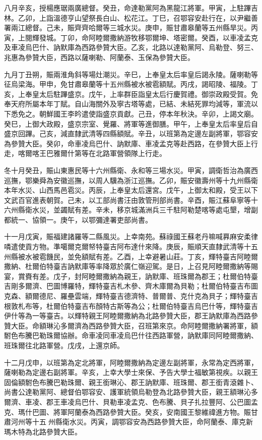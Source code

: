 \begin{pinyinscope}
八月辛亥，授楊應琚兩廣總督。癸丑，命達勒黨阿為黑龍江將軍。甲寅，上駐蹕吉林。乙卯，上詣溫德亨山望祭長白山、松花江。丁巳，召鄂容安赴行在，以尹繼善署兩江總督。己未，賑齊齊哈爾等三城水災。庚申，賑甘肅皋蘭等五州縣旱災。丙寅，上閱輝發城。丁卯，命阿睦爾撒納游牧移鄂爾坤、塔密爾。癸酉，以車凌孟克及車凌烏巴什、訥默庫為西路參贊大臣。乙亥，北路以達勒黨阿、烏勒登、努三、兆惠為參贊大臣，西路以薩喇勒、阿蘭泰、玉保為參贊大臣。

九月丁丑朔，賑兩淮角斜等場灶潮災。辛巳，上奉皇太后率皇后謁永陵。薩喇勒等征烏梁海。甲申，免甘肅皋蘭等十五州縣被水被雹額賦。丙戌，謁昭陵、福陵。丁亥，上奉皇太后駐蹕盛京。戊午，上率群臣詣皇太后行慶賀禮。御崇政殿受賀。免奉天府所屬本年丁賦。自山海關外及寧古塔等處，已結、未結死罪均減等，軍流以下悉免之。朝鮮國王李昑遣使詣盛京貢獻。己丑，停本年秋決。辛卯，上謁文廟。癸巳，上御大政殿，盛京宗室、覺羅、將軍等進御膳。甲午，上奉皇太后率皇后自盛京回蹕。己亥，減直隸武清等四縣額賦。辛丑，以班第為定邊左副將軍，鄂容安為參贊大臣。癸卯，命車凌烏巴什、訥默庫、車凌孟克等赴西路，在參贊大臣上行走，喀爾喀王巴雅爾什第等在北路軍營領隊上行走。

冬十月癸丑，賑山東惠民等十六州縣衛、永和等三場水災。甲寅，調衛哲治為廣西巡撫，鄂樂舜為安徽巡撫，以周人驥為浙江巡撫。乙卯，賑安徽壽州等十九州縣衛本年水災、山西馬邑雹災。丙辰，上奉皇太后還宮。戊午，上御太和殿，受王以下文武百官進表朝賀。己未，以工部尚書汪由敦管刑部尚書。辛酉，賑江蘇阜寧等十六州縣衛水災，並蠲賦有差。辛未，移京城滿洲兵三千駐阿勒楚喀等處屯墾，增副都統一、協領一。庚午，以鄂彌達署吏部尚書。

十一月戊寅，賑福建諸羅等二縣風災。上幸南苑。蘇祿國王蘇老丹嘛喊奡麻安柔律噒遣使貢方物。準噶爾克爾帑特臺吉阿布達什來降。庚辰，賑順天直隸武清等十五州縣被水被雹饑民，並免額賦有差。乙酉，上幸避暑山莊。丁亥，輝特臺吉阿睦爾撒納、杜爾伯特臺吉訥默庫等率降眾於廣仁嶺迎駕。是日，上召見阿睦爾撒納等賜宴，賞賚有差。戊子，封阿睦爾撒納為親王，訥默庫、班珠爾為郡王；杜爾伯特臺吉剛多爾濟、巴圖博羅特，輝特臺吉札木參、齊木庫爾為貝勒；杜爾伯特臺吉布圖克森、額爾德尼、羅壘雲端，輝特臺吉德濟特、普爾普、克什克為貝子；輝特臺吉根敦札布等，杜爾伯特臺吉布顏特古斯等為公；杜爾伯特臺吉烏巴什等，輝特臺吉伊什等為一等臺吉。以輝特親王阿睦爾撒納為北路參贊大臣，郡王訥默庫為西路參贊大臣。命額琳沁多爾濟為西路參贊大臣，召班第來京。命阿睦爾撒納署將軍，額駙色布騰巴勒珠爾協辦。命車凌同車凌烏巴什往西路軍營，訥默庫同阿睦爾撒納、班珠爾往北路軍營。戊戌，上還京師。

十二月戊申，以班第為定北將軍，阿睦爾撒納為定邊左副將軍，永常為定西將軍，薩喇勒為定邊右副將軍。辛亥，上幸大學士來保、予告大學士福敏第視疾。以親王固倫額駙色布騰巴勒珠爾、親王銜琳沁、郡王訥默庫、班珠爾、郡王銜青滾雜卜、尚書公達勒黨阿、總督伯鄂容安、護軍統領烏勒登為北路參贊大臣，親王額琳沁多爾濟、車凌、郡王車凌烏巴什、貝勒車凌孟克、色布騰、貝子扎拉豐阿、公巴圖孟克、瑪什巴圖、將軍阿蘭泰為西路參贊大臣。癸亥，安南國王黎維禕進方物。賑甘肅河州等十五州縣衛水災。丙寅，調鄂容安為西路參贊大臣，命阿蘭泰、庫克新瑪木特為北路參贊大臣。


\end{pinyinscope}
